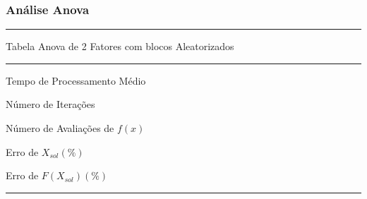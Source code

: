 \subsubsection{Análise Anova}

    \begin{minipage}[h!]{\linewidth}
    \centering
    \hrule
    \vspace{2mm}
    {Tabela Anova de 2 Fatores com blocos Aleatorizados}
    \vspace{2mm}
    \noindent
    \hrule 
    \vspace{2mm}
    Tempo de Processamento Médio\\
    \label{tab:tblDa} 
    \writeanova{\tblanovaT}\par
    \bigskip
    \centering
    Número de Iterações\\
    \label{tab:tblDb} 
    \writeanova{\tblanovaNI}\par
    \bigskip
    \centering
    Número de Avaliações de $f(x)$\\
    \label{tab:tblDc} 
    \writeanova{\tblanovaNE}\par
    \bigskip
    \centering
    {Erro de $X_{sol}(\%)$}\\
    \label{tab:tblDb} 
    \writeanova{\tblanovaEX}\par
    \bigskip
    \centering
    {Erro de $F(X_{sol})(\%)$}\\
    \label{tab:tblDb} 
    \writeanova{\tblanovaEF}\par
    \vspace{2mm}
    \hrule
    \vspace{2mm}
    \end{minipage}
    
